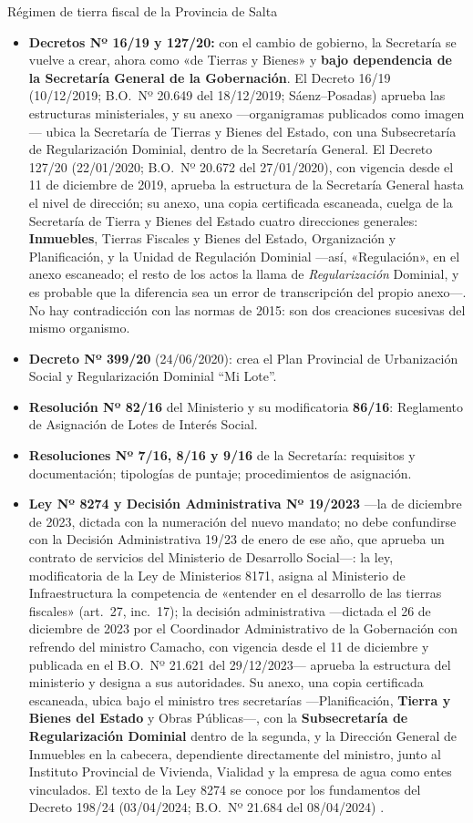 \begin{ficha}{Régimen de tierra fiscal de la Provincia de Salta}
\begin{itemize}[leftmargin=*,nosep]
\item \textbf{Decretos Nº 16/19 y 127/20:} con el cambio de gobierno, la Secretaría se vuelve a crear, ahora como «de Tierras y Bienes» y \textbf{bajo dependencia de la Secretaría General de la Gobernación}. El Decreto 16/19 (10/12/2019; B.O.\ Nº 20.649 del 18/12/2019; Sáenz--Posadas) aprueba las estructuras ministeriales, y su anexo ---organigramas publicados como imagen--- ubica la Secretaría de Tierras y Bienes del Estado, con una Subsecretaría de Regularización Dominial, dentro de la Secretaría General. El Decreto 127/20 (22/01/2020; B.O.\ Nº 20.672 del 27/01/2020), con vigencia desde el 11 de diciembre de 2019, aprueba la estructura de la Secretaría General hasta el nivel de dirección; su anexo, una copia certificada escaneada, cuelga de la Secretaría de Tierra y Bienes del Estado cuatro direcciones generales: \textbf{Inmuebles}, Tierras Fiscales y Bienes del Estado, Organización y Planificación, y la Unidad de Regulación Dominial ---así, «Regulación», en el anexo escaneado; el resto de los actos la llama de \textit{Regularización} Dominial, y es probable que la diferencia sea un error de transcripción del propio anexo---. No hay contradicción con las normas de 2015: son dos creaciones sucesivas del mismo organismo.
\item \textbf{Decreto Nº 399/20} (24/06/2020): crea el Plan Provincial de Urbanización Social y Regularización Dominial ``Mi Lote''.
\item \textbf{Resolución Nº 82/16} del Ministerio y su modificatoria \textbf{86/16}: Reglamento de Asignación de Lotes de Interés Social.
\item \textbf{Resoluciones Nº 7/16, 8/16 y 9/16} de la Secretaría: requisitos y documentación; tipologías de puntaje; procedimientos de asignación.
\item \textbf{Ley Nº 8274 y Decisión Administrativa Nº 19/2023} ---la de diciembre de 2023, dictada con la numeración del nuevo mandato; no debe confundirse con la Decisión Administrativa 19/23 de enero de ese año, que aprueba un contrato de servicios del Ministerio de Desarrollo Social---: la ley, modificatoria de la Ley de Ministerios 8171, asigna al Ministerio de Infraestructura la competencia de «entender en el desarrollo de las tierras fiscales» (art.\ 27, inc.\ 17); la decisión administrativa ---dictada el 26 de diciembre de 2023 por el Coordinador Administrativo de la Gobernación con refrendo del ministro Camacho, con vigencia desde el 11 de diciembre y publicada en el B.O.\ Nº 21.621 del 29/12/2023--- aprueba la estructura del ministerio y designa a sus autoridades. Su anexo, una copia certificada escaneada, ubica bajo el ministro tres secretarías ---Planificación, \textbf{Tierra y Bienes del Estado} y Obras Públicas---, con la \textbf{Subsecretaría de Regularización Dominial} dentro de la segunda, y la Dirección General de Inmuebles en la cabecera, dependiente directamente del ministro, junto al Instituto Provincial de Vivienda, Vialidad y la empresa de agua como entes vinculados. El texto de la Ley 8274 se conoce por los fundamentos del Decreto 198/24 (03/04/2024; B.O.\ Nº 21.684 del 08/04/2024) .

\end{itemize}
\end{ficha}
